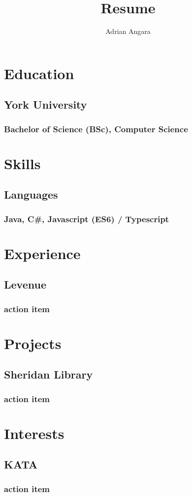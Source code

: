 \documentclass{article}
\begin{document}
\title{Resume}
\author{Adrian Angara}

\maketitle


\section{Education}
\subsection{York University}
\subsubsection{Bachelor of Science (BSc), Computer Science}

\section{Skills}
\subsection{Languages}
\subsubsection{Java, C#, Javascript (ES6) / Typescript}
\section{Experience}
\subsection{Levenue}
\subsubsection{action item}
\section{Projects}
\subsection{Sheridan Library}
\subsubsection{action item}
\section{Interests}
\subsection{KATA}
\subsubsection{action item}
\end{document}
